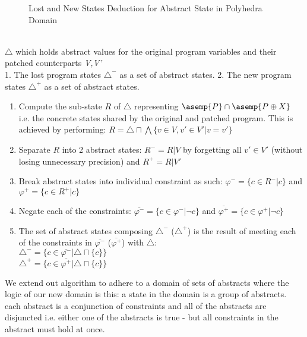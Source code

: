 \begin{figure}[H] \label{Fig:NewLostStates}
\caption{Lost and New States Deduction for Abstract State in Polyhedra Domain}
\end{figure}

 \\
 $\triangle$ which holds abstract values for the original program variables and their patched counterparts \emph{V,V'} \\
 1. The lost program states $\triangle^-$ as a set of abstract states. 2. The new program states $\triangle^+$ as a set of abstract states. \\
\begin{enumerate}
\item Compute the sub-state $R$ of $\triangle$ representing $\asemp{P} \cap \asemp{P\oplus X}$ i.e. the concrete states shared by the original and patched program. This is achieved by performing: $R = \triangle \sqcap \bigwedge\{v \in V, v' \in V' | v = v'\}$
\item Separate $R$ into 2 abstract states: $R^- = R|V$ by forgetting all  $v' \in V'$ (without losing unnecessary precision) and $R^+ = R|V'$
\item Break abstract states into individual constraint as such: $\varphi^- = \{ c \in R^- | c \}$ and $\varphi^+ = \{ c \in R^+ | c \}$
\item Negate each of the constraints: $ \overline{\varphi^-} = \{ c \in \varphi^- | \neg c \}$ and $\overline{\varphi^+} = \{ c \in \varphi^+ | \neg c \}$
\item The set of abstract states composing $\triangle^-$ ($\triangle^+$) is the result of meeting each of the constraints in $\overline{\varphi^-}$ ($\overline{\varphi^+}$) with $\triangle$:\\
    $\triangle^- = \{ c \in \overline{\varphi^-} | \triangle \sqcap \{ c \} \}$ \\
    $\triangle^+ = \{ c \in \overline{\varphi^+} | \triangle \sqcap \{ c \} \}$
\end{enumerate}

We extend out algorithm to adhere to a domain of sets of abstracts where the logic of our new domain is this: a state in the domain is a group of abstracts. each abstract is a conjunction of constraints and all of the abstracts are disjuncted i.e. either one of the abstracts is true - but all constraints in the abstract must hold at once.

